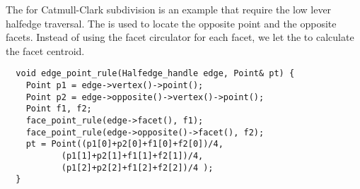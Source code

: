 The  for Catmull-Clark subdivision
is an example that require the low lever halfedge traversal.
The  is used to locate the
opposite point and the opposite facets. Instead of using 
the facet circulator for each facet, we let
the  to calculate the facet centroid.
\begin{lstlisting}
  void edge_point_rule(Halfedge_handle edge, Point& pt) {
    Point p1 = edge->vertex()->point();
    Point p2 = edge->opposite()->vertex()->point();
    Point f1, f2;
    face_point_rule(edge->facet(), f1);
    face_point_rule(edge->opposite()->facet(), f2);
    pt = Point((p1[0]+p2[0]+f1[0]+f2[0])/4,
	       (p1[1]+p2[1]+f1[1]+f2[1])/4,
	       (p1[2]+p2[2]+f1[2]+f2[2])/4 );
  }
\end{lstlisting}


